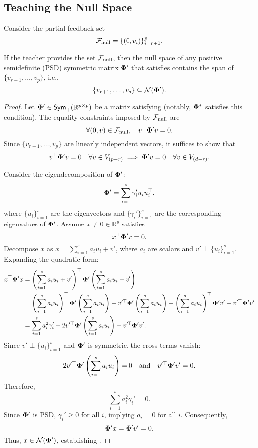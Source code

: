 \subsection{Teaching the Null Space}

Consider the partial feedback set
\[
    {\mathcal{F}}_{\text{null}} = \{(0, v_i)\}_{i=r+1}^p.
\]
\begin{lemma}\label{lem:nullset}
    If the teacher provides the set ${\mathcal{F}}_{\text{null}}$, then the null space of any positive semidefinite (PSD) symmetric matrix $\boldsymbol{\Phi}'$ that satisfies  contains the span of $\{v_{r+1}, \ldots, v_p\}$, i.e.,
    \[
        \{v_{r+1}, \ldots, v_p\} \subseteq \mathcal{N}(\boldsymbol{\Phi}').
    \]
\end{lemma}
\begin{proof}
    Let $\boldsymbol{\Phi}' \in \textsf{Sym}_{+}(\mathbb{R}^{p\times p})$ be a matrix satisfying  (notably, $\boldsymbol{\Phi}^*$ satisfies this condition). The equality constraints imposed by ${\mathcal{F}}_{\text{null}}$ are
    \[
        \forall (0, v) \in {\mathcal{F}}_{\text{null}}, \quad v^{\top} \boldsymbol{\Phi}' v = 0.
    \]
    Since $\{v_{r+1}, \ldots, v_p\}$ are linearly independent vectors, it suffices to show that
    \begin{align}
        v^{\top} \boldsymbol{\Phi}' v = 0 \quad \forall v \in V_{(p-r)} \implies \boldsymbol{\Phi}' v = 0 \quad \forall v \in V_{(d-r)}. \label{eq:lemmain}
    \end{align}
    
    Consider the eigendecomposition of $\boldsymbol{\Phi}'$:
    \[
        \boldsymbol{\Phi}' = \sum_{i=1}^{s} \gamma_i' u_i u_i^{\top},
    \]
    where $\{u_i\}_{i=1}^{s}$ are the eigenvectors and $\{\gamma_i'\}_{i=1}^{s}$ are the corresponding eigenvalues of $\boldsymbol{\Phi}'$. Assume $x \neq 0 \in \mathbb{R}^p$ satisfies
    \[
        x^{\top} \boldsymbol{\Phi}' x = 0.
    \]
    Decompose $x$ as $x = \sum_{i=1}^s a_i u_i + v'$, where $a_i$ are scalars and $v' \perp \{u_i\}_{i=1}^s$. Expanding the quadratic form:
    \begin{align*}
        x^{\top} \boldsymbol{\Phi}' x &= \left(\sum_{i=1}^s a_i u_i + v'\right)^{\top} \boldsymbol{\Phi}' \left(\sum_{i=1}^s a_i u_i + v'\right) \\
        &= \left(\sum_{i=1}^s a_i u_i\right)^{\top} \boldsymbol{\Phi}' \left(\sum_{i=1}^s a_i u_i\right) + v'^{\top} \boldsymbol{\Phi}' \left(\sum_{i=1}^s a_i u_i\right) + \left(\sum_{i=1}^s a_i u_i\right)^{\top} \boldsymbol{\Phi}' v' + v'^{\top} \boldsymbol{\Phi}' v' \\
        &= \sum_{i=1}^s a_i^2 \gamma_i' + 2 v'^{\top} \boldsymbol{\Phi}' \left(\sum_{i=1}^s a_i u_i\right) + v'^{\top} \boldsymbol{\Phi}' v'.
    \end{align*}
    Since $v' \perp \{u_i\}_{i=1}^s$ and $\boldsymbol{\Phi}'$ is symmetric, the cross terms vanish:
    \[
        2 v'^{\top} \boldsymbol{\Phi}' \left(\sum_{i=1}^s a_i u_i\right) = 0 \quad \text{and} \quad v'^{\top} \boldsymbol{\Phi}' v' = 0.
    \]
    Therefore,
    \[
        \sum_{i=1}^s a_i^2 \gamma_i' = 0.
    \]
    Since $\boldsymbol{\Phi}'$ is PSD, $\gamma_i' \geq 0$ for all $i$, implying $a_i = 0$ for all $i$. Consequently,
    \[
        \boldsymbol{\Phi}' x = \boldsymbol{\Phi}' v' = 0.
    \]
    Thus, $x \in \mathcal{N}(\boldsymbol{\Phi}')$, establishing .
    

\end{proof}
